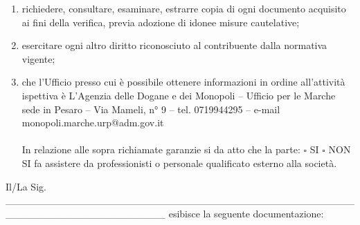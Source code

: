 \documentclass[12pt]{article}
\newcommand\nomeConcessionario{$nomeConcessionario}
\newcommand\titoloAutorizzatorio{$titoloAutorizzatorio}
\newcommand\dataTitoloAutorizzatorio{$dataTitoloAutorizzatorio}
\begin{document}
\begin{enumerate}
\begin{enumerate}
        \item richiedere, consultare, esaminare, estrarre copia di ogni documento acquisito ai fini della verifica, previa adozione di idonee misure cautelative;
        \item esercitare ogni altro diritto riconosciuto al contribuente dalla normativa vigente;
        \item che l’Ufficio presso cui è possibile ottenere informazioni in ordine all’attività ispettiva è L’Agenzia delle Dogane e dei Monopoli – Ufficio per le Marche sede in Pesaro – Via Mameli, n° 9 – tel. 0719944295 – e-mail monopoli.marche.urp@adm.gov.it \\\\
        In relazione alle sopra richiamate garanzie si da atto che la parte:
        \begin{math}\square\end{math} SI \begin{math}\square\end{math} NON SI fa assistere da professionisti o personale qualificato esterno alla società.

    \end{enumerate}

\end{enumerate}

Il/La Sig. \_\_\_\_\_\_\_\_\_\_\_\_\_\_\_\_\_\_\_\_\_\_\_\_\_\_\_\_\_\_\_\_\_\_\_\_\_\_\_\_\_\_\_\_\_\_\_\_\_\_\_\_\_\_\_\_\_\_\_\_\_\_\_\_\_\_\_\_\_\_ esibisce la seguente documentazione:

\end{document}
